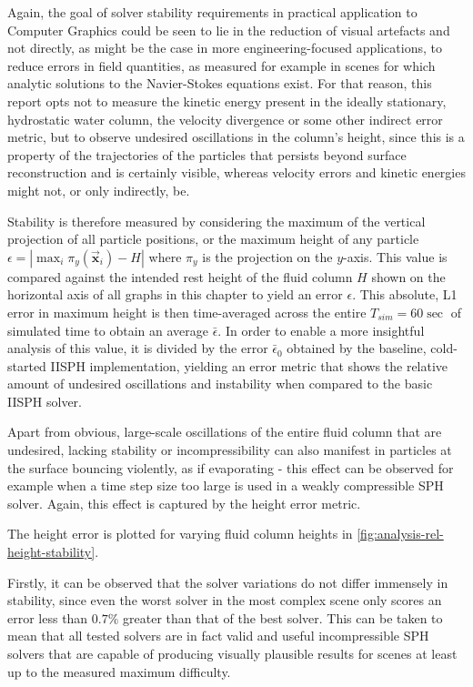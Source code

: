 \documentclass[oneside, a4paper]{book}
\newcommand\abs[1]{\left|#1\right|}
\newcommand\vek[1]{\vec{\bm{#1}}}
\newcommand\br[1]{\left(#1\right)}
\begin{document}
  Again, the goal of solver stability requirements in practical application to Computer Graphics could be seen to lie in the reduction of visual artefacts and not directly, as might be the case in more engineering-focused applications, to reduce errors in field quantities, as measured for example in scenes for which analytic solutions to the Navier-Stokes equations exist. For that reason, this report opts not to measure the kinetic energy present in the ideally stationary, hydrostatic water column, the velocity divergence or some other indirect error metric, but to observe undesired oscillations in the column's height, since this is a property of the trajectories of the particles that persists beyond surface reconstruction and is certainly visible, whereas velocity errors and kinetic energies might not, or only indirectly, be. 

  Stability is therefore measured by considering the maximum of the vertical projection of all particle positions, or the maximum height of any particle $\epsilon = \abs{\max_i \pi_y\br{\vek{x}_{i}} - H}$ where $\pi_{y}$ is the projection on the $y$-axis. This value is compared against the intended rest height of the fluid column $H$ shown on the horizontal axis of all graphs in this chapter to yield an error $\epsilon$. This absolute, L1 error in maximum height is then time-averaged across the entire $T_{sim}=60\sec$ of simulated time to obtain an average $\bar{\epsilon}$. In order to enable a more insightful analysis of this value, it is divided by the error $\bar{\epsilon}_0$ obtained by the baseline, cold-started IISPH implementation, yielding an error metric that shows the relative amount of undesired oscillations and instability when compared to the basic IISPH solver.

  Apart from obvious, large-scale oscillations of the entire fluid column that are undesired, lacking stability or incompressibility can also manifest in particles at the surface bouncing violently, as if evaporating - this effect can be observed for example when a time step size too large is used in a weakly compressible SPH solver. Again, this effect is captured by the height error metric.

  The height error is plotted for varying fluid column heights in \autoref{fig:analysis-rel-height-stability}. 

  Firstly, it can be observed that the solver variations do not differ immensely in stability, since even the worst solver in the most complex scene only scores an error less than $0.7\%$ greater than that of the best solver. This can be taken to mean that all tested solvers are in fact valid and useful incompressible SPH solvers that are capable of producing visually plausible results for scenes at least up to the measured maximum difficulty. 
  
\end{document}
